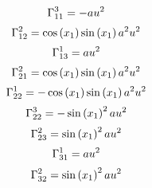 \begin{dmath}
\Gamma_{11}^{3}=-a\*u^2
\end{dmath}
\begin{dmath}
\Gamma_{12}^{2}=\cos\left(x_{1}\right)\*\sin\left(x_{1}\right)\*a^2\*u^2
\end{dmath}
\begin{dmath}
\Gamma_{13}^{1}=a\*u^2
\end{dmath}
\begin{dmath}
\Gamma_{21}^{2}=\cos\left(x_{1}\right)\*\sin\left(x_{1}\right)\*a^2\*u^2
\end{dmath}
\begin{dmath}
\Gamma_{22}^{1}=-\cos\left(x_{1}\right)\*\sin\left(x_{1}\right)\*a^2\*u^2
\end{dmath}
\begin{dmath}
\Gamma_{22}^{3}=-\sin\left(x_{1}\right)^2\*a\*u^2
\end{dmath}
\begin{dmath}
\Gamma_{23}^{2}=\sin\left(x_{1}\right)^2\*a\*u^2
\end{dmath}
\begin{dmath}
\Gamma_{31}^{1}=a\*u^2
\end{dmath}
\begin{dmath}
\Gamma_{32}^{2}=\sin\left(x_{1}\right)^2\*a\*u^2
\end{dmath}

